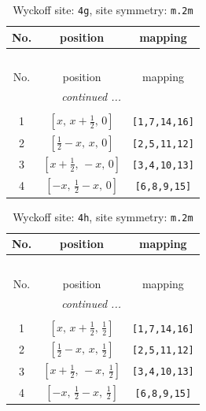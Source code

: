 \documentclass[fleqn,8pt]{jsarticle}
\begin{document}
\renewcommand{\arraystretch}{1.2}
\begin{longtable}{ccc}
\caption{Wyckoff site: {\tt 4g}, site symmetry: {\tt m.2m}}
 \\
 \hline \hline
No. & position & mapping \\ \hline \endfirsthead

\multicolumn{2}{l}{\tablename\ \thetable{}} \\
 \hline \hline
No. & position & mapping \\ \hline \endhead

 \hline \hline
\multicolumn{2}{r}{\footnotesize\it continued ...} \\ \endfoot

 \hline \hline
\multicolumn{2}{r}{} \\ \endlastfoot

1 & $\left[ x,\, x + \frac{1}{2},\, 0 \right]$ & {\tt [1,7,14,16]} \\ \hline
2 & $\left[ \frac{1}{2} - x,\, x,\, 0 \right]$ & {\tt [2,5,11,12]} \\ \hline
3 & $\left[ x + \frac{1}{2},\, - x,\, 0 \right]$ & {\tt [3,4,10,13]} \\ \hline
4 & $\left[ - x,\, \frac{1}{2} - x,\, 0 \right]$ & {\tt [6,8,9,15]} \\
\end{longtable}
\renewcommand{\arraystretch}{1.2}
\begin{longtable}{ccc}
\caption{Wyckoff site: {\tt 4h}, site symmetry: {\tt m.2m}}
 \\
 \hline \hline
No. & position & mapping \\ \hline \endfirsthead

\multicolumn{2}{l}{\tablename\ \thetable{}} \\
 \hline \hline
No. & position & mapping \\ \hline \endhead

 \hline \hline
\multicolumn{2}{r}{\footnotesize\it continued ...} \\ \endfoot

 \hline \hline
\multicolumn{2}{r}{} \\ \endlastfoot

1 & $\left[ x,\, x + \frac{1}{2},\, \frac{1}{2} \right]$ & {\tt [1,7,14,16]} \\ \hline
2 & $\left[ \frac{1}{2} - x,\, x,\, \frac{1}{2} \right]$ & {\tt [2,5,11,12]} \\ \hline
3 & $\left[ x + \frac{1}{2},\, - x,\, \frac{1}{2} \right]$ & {\tt [3,4,10,13]} \\ \hline
4 & $\left[ - x,\, \frac{1}{2} - x,\, \frac{1}{2} \right]$ & {\tt [6,8,9,15]} \\
\end{longtable}
\end{document}
